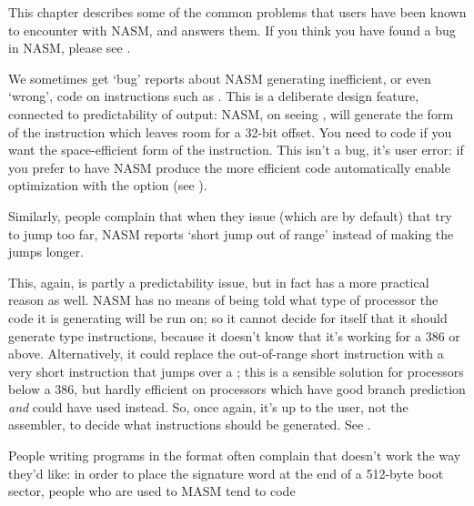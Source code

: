 %
%

This chapter describes some of the common problems that users have
been known to encounter with NASM, and answers them. If you think you
have found a bug in NASM, please see .



We sometimes get `bug' reports about NASM generating inefficient, or
even `wrong', code on instructions such as . This is a
deliberate design feature, connected to predictability of output:
NASM, on seeing , will generate the form of the
instruction which leaves room for a 32-bit offset. You need to code
 if you want the space-efficient
form of the instruction. This isn't a bug, it's user error: if you
prefer to have NASM produce the more efficient code automatically enable
optimization with the  option (see ).


Similarly, people complain that when they issue  (which are  by default) that try to jump too far,
NASM reports `short jump out of range' instead of making the jumps
longer.

This, again, is partly a predictability issue, but in fact has a
more practical reason as well. NASM has no means of being told what
type of processor the code it is generating will be run on; so it
cannot decide for itself that it should generate 
type instructions, because it doesn't know that it's working for a 386 or
above. Alternatively, it could replace the out-of-range short
 instruction with a very short  instruction that jumps
over a ; this is a sensible solution for processors
below a 386, but hardly efficient on processors which have good
branch prediction \emph{and} could have used  instead. So,
once again, it's up to the user, not the assembler, to decide what
instructions should be generated. See .


People writing  programs in the  format often
complain that  doesn't work the way they'd like: in order to
place the  signature word at the end of a 512-byte boot
sector, people who are used to MASM tend to code

